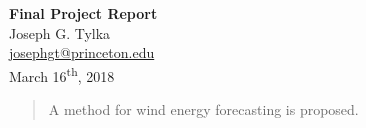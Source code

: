 \documentclass[11pt, oneside]{article}
\begin{document}
\begin{centering}
{\Large \textbf{Final Project Report}}\\
\vspace{\baselineskip}
Joseph G. Tylka\\
\href{mailto:josephgt@princeton.edu}{josephgt@princeton.edu}\\
\vspace{\baselineskip}
March 16\textsuperscript{th}, 2018\\
\end{centering}

\begin{abstract}
A method for wind energy forecasting is proposed.
\end{abstract}
\end{document}
